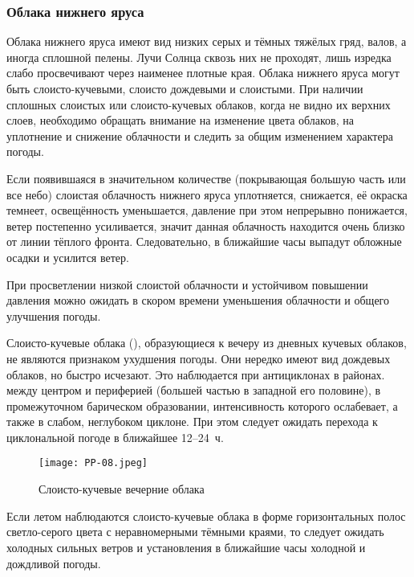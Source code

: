 \subsubsection{Облака нижнего яруса}

Облака нижнего яруса имеют вид низких серых и тёмных тяжёлых гряд,
валов, а иногда сплошной пелены. Лучи Солнца сквозь них не проходят,
лишь изредка слабо просвечивают через наименее плотные края. Облака
нижнего яруса могут быть слоисто-кучевыми, слоисто дождевыми и
слоистыми. При наличии сплошных слоистых или слоисто-кучевых облаков,
когда не видно их верхних слоев, необходимо обращать внимание на
изменение цвета облаков, на уплотнение и снижение облачности и следить
за общим изменением характера погоды.

 Если появившаяся в значительном количестве (покрывающая большую
часть или все небо) слоистая облачность нижнего яруса уплотняется,
снижается, её окраска темнеет, освещённость уменьшается, давление при
этом непрерывно понижается, ветер постепенно усиливается, значит
данная облачность находится очень близко от линии тёплого
фронта. Следовательно, в ближайшие часы выпадут обложные осадки и
усилится ветер.

 При просветлении низкой слоистой облачности и устойчивом
повышении давления можно ожидать в скором времени уменьшения
облачности и общего улучшения погоды.

 Слоисто-кучевые облака (), образующиеся к вечеру из
дневных кучевых облаков, не являются признаком ухудшения погоды. Они
нередко имеют вид дождевых облаков, но быстро исчезают. Это
наблюдается при антициклонах в районах. между центром и периферией
(большей частью в западной его половине), в промежуточном барическом
образовании,
интенсивность которого ослабевает, а также в слабом,
неглубоком циклоне. При этом следует ожидать перехода к циклональной
погоде в ближайшее 12--24~ч.

\begin{figure}[htb]
  \centering{}
  \texttt{[image: PP-08.jpeg]}
  \caption{Слоисто-кучевые вечерние облака}
  \label{fig:pp08}
  \small
  \centering{}
\end{figure}

 Если летом наблюдаются слоисто-кучевые облака в форме
горизонтальных полос светло-серого цвета с неравномерными тёмными
краями, то следует ожидать холодных сильных ветров и установления в
ближайшие часы холодной и дождливой погоды.

